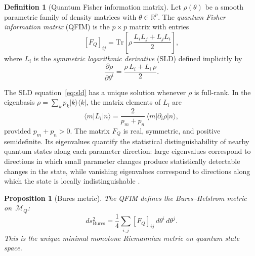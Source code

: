 \documentclass[12pt,a4paper]{article}
\newtheorem{proposition}[theorem]{Proposition}
\theoremstyle{definition}
\newtheorem{definition}[theorem]{Definition}
\theoremstyle{remark}
\begin{document}
\begin{definition}[Quantum Fisher information matrix]
\label{def:qfim}
Let $\rho(\theta)$ be a smooth parametric family of density matrices with $\theta \in \mathbb{R}^p$. The \emph{quantum Fisher information matrix} (QFIM) is the $p \times p$ matrix with entries
\begin{equation}
\label{eq:qfim}
[F_Q]_{ij} = \mathrm{Tr}\!\left[\rho\,\frac{L_i L_j + L_j L_i}{2}\right],
\end{equation}
where $L_i$ is the \emph{symmetric logarithmic derivative} (SLD) defined implicitly by
\begin{equation}
\label{eq:sld}
\frac{\partial \rho}{\partial \theta^i} = \frac{\rho\, L_i + L_i\, \rho}{2}.
\end{equation}
\end{definition}

The SLD equation~\eqref{eq:sld} has a unique solution whenever $\rho$ is full-rank. In the eigenbasis $\rho = \sum_k p_k \lvert k \rangle\!\langle k \rvert$, the matrix elements of $L_i$ are
\begin{equation}
\label{eq:sld-matrix}
\langle m \rvert L_i \lvert n \rangle = \frac{2}{p_m + p_n}\,\langle m \rvert \partial_i \rho \lvert n \rangle,
\end{equation}
provided $p_m + p_n > 0$. The matrix $F_Q$ is real, symmetric, and positive semidefinite. Its eigenvalues quantify the statistical distinguishability of nearby quantum states along each parameter direction: large eigenvalues correspond to directions in which small parameter changes produce statistically detectable changes in the state, while vanishing eigenvalues correspond to directions along which the state is locally indistinguishable \cite{liu2020quantum,petz2011introduction}.

\begin{proposition}[Bures metric]
\label{prop:bures}
The QFIM defines the Bures--Helstrom metric on~$\mathcal{M}_Q$:
\begin{equation}
\label{eq:bures}
ds^2_{\mathrm{Bures}} = \frac{1}{4}\sum_{i,j} [F_Q]_{ij}\, d\theta^i\, d\theta^j.
\end{equation}
This is the unique minimal monotone Riemannian metric on quantum state space.
\end{proposition}
\end{document}
